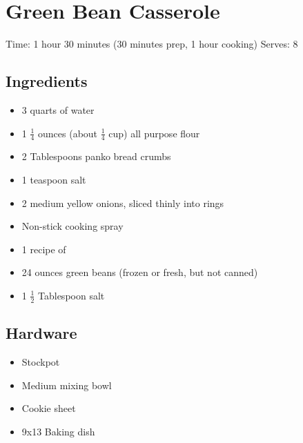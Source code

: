 \section{Green Bean Casserole}
\label{greenBeanCasserole}
\setcounter{secnumdepth}{0}
Time: 1 hour 30 minutes (30 minutes prep, 1 hour cooking)
Serves: 8

\begin{multicols}{2}
\subsection*{Ingredients}
\begin{itemize}
    \item 3 quarts of water
    \item 1 \( \frac{1}{4} \) ounces (about \( \frac{1}{4} \) cup) all purpose flour
    \item 2 Tablespoons panko bread crumbs
    \item 1 teaspoon salt
    \item 2 medium yellow onions, sliced thinly into rings
    \item Non-stick cooking spray
    \item 1 recipe of 
    \item 24 ounces green beans (frozen or fresh, but not canned)
    \item 1 \( \frac{1}{2} \) Tablespoon salt
\end{itemize}

\subsection*{Hardware}
\begin{itemize}
    \item Stockpot
    \item Medium mixing bowl
    \item Cookie sheet
    \item 9x13 Baking dish
\end{itemize}
\clearpage


\end{multicols}
